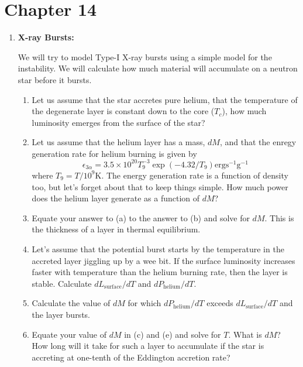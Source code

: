 \documentclass{article}
\begin{document}
\fi

\section{Chapter 14}
\begin{enumerate}
\item{\bf X-ray Bursts:}

We will try to model Type-I X-ray bursts using a simple model for the instability. We will calculate how much material will accumulate on a neutron star before it bursts.
\begin{enumerate}
\item Let us assume that the star accretes pure helium, that the
  temperature of the degenerate layer is constant down to the core
  ($T_c$), how much luminosity emerges from the surface of the star? 

\item Let us assume that the helium layer has a mass, $dM$, and that the enregy generation rate for helium burning is given by
$$
\epsilon_{3\alpha} = 3.5 \times 10^{20} T_9^{-3} \exp(-4.32/T_9) \mathrm{erg s}^{-1} \mathrm{g}^{-1}
$$
where $T_9=T/10^9 \mathrm{K}$. The energy generation rate is a
function of density too, but let's forget about that to keep things
simple. How much power does the helium layer generate as a function of
$dM$?

\item Equate your answer to (a) to the answer to (b) and solve for
  $dM$. This is the thickness of a layer in thermal equilibrium.

\item Let's assume that the potential burst starts by the temperature
  in the accreted layer jiggling up by a wee bit. If the surface
  luminosity increases faster with temperature than the helium burning
  rate, then the layer is stable. Calculate $dL_\mathrm{surface}/dT$ and
  $dP_\mathrm{helium}/dT$.

\item Calculate the value of $dM$ for which $dP_\mathrm{helium}/dT$
  exceeds $dL_\mathrm{surface}/dT$ and the layer bursts.

\item Equate your value of $dM$ in (c) and (e) and solve for $T$. What
  is $dM$? How long will it take for such a layer to accumulate if the
  star is accreting at one-tenth of the Eddington accretion rate?


\end{enumerate}
\end{enumerate}
\end{document}

